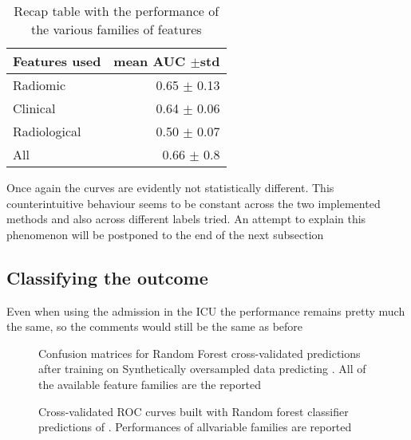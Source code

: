 \begin{table}
\caption{Recap table with the performance of the various families of features \label{tab:RecapDeathRF}}
\centering
\begin{tabular}{l|r}
\toprule
Features used & mean AUC $\pm$std\\
\midrule
Radiomic  & 0.65 $\pm$ 0.13\\
Clinical  &  0.64 $\pm$ 0.06\\
Radiological & 0.50 $\pm$ 0.07\\
All & 0.66 $\pm$ 0.8 \\
\bottomrule
\end{tabular}
\end{table}

Once again the curves are evidently not statistically different. This counterintuitive behaviour seems to be constant across the two implemented methods and also across different labels tried. An attempt to explain this phenomenon will be postponed to the end of the next subsection

\subsection{Classifying the outcome \icu}
Even when using the admission in the ICU the performance remains pretty much the same, so the comments would still be the same as before

\begin{figure}[H]
\centering
	\newline
        \caption{Confusion matrices for Random Forest cross-validated predictions after training on Synthetically oversampled data predicting \icu. All of the available feature families are the reported}\label{fig:RFicu}
\end{figure}


\begin{figure}[H]
\centering
	\newline
        \caption{Cross-validated ROC curves built with Random forest classifier predictions of \death. Performances of allvariable families are reported}\label{fig:RFicuROC}
\end{figure}


